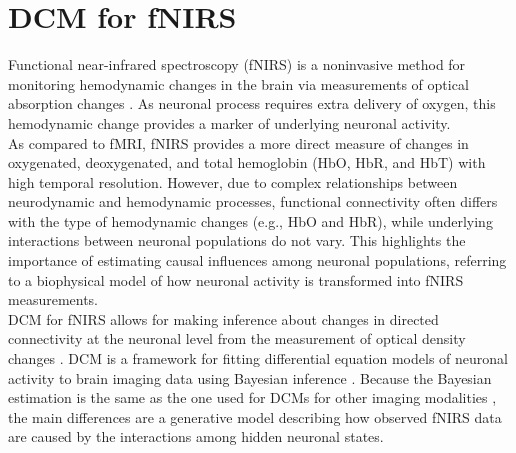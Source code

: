 

\chapter{DCM for fNIRS \label{Chap:data:fnirs}}

Functional near-infrared spectroscopy (fNIRS) is a noninvasive method for monitoring hemodynamic changes in the brain via measurements of optical absorption changes \cite{jobsis1977noninvasive}. As neuronal process requires extra delivery of oxygen, this hemodynamic change provides a marker of underlying neuronal activity. \\

As compared to fMRI, fNIRS provides a more direct measure of changes in oxygenated, deoxygenated, and total hemoglobin (HbO, HbR, and HbT) with high temporal resolution. However, due to complex relationships between neurodynamic and hemodynamic processes, functional connectivity often differs with the type of hemodynamic changes (e.g., HbO and HbR), while underlying interactions between neuronal populations do not vary. This highlights the importance of estimating causal influences among neuronal populations, referring to a biophysical model of how neuronal activity is transformed into fNIRS measurements. \\

DCM for fNIRS allows for making inference about changes in directed connectivity at the neuronal level from the measurement of optical density changes \cite{tak2015dynamic}. DCM is a framework for fitting differential equation models of neuronal activity to brain imaging data using Bayesian inference \cite{dcm, karl_vb_laplace, dcm_families}. Because the Bayesian estimation is the same as the one used for DCMs for other imaging modalities \cite{karl_vb_laplace, dcm_families}, the main differences are a generative model describing how observed fNIRS data are caused by the interactions among hidden neuronal states. \\

